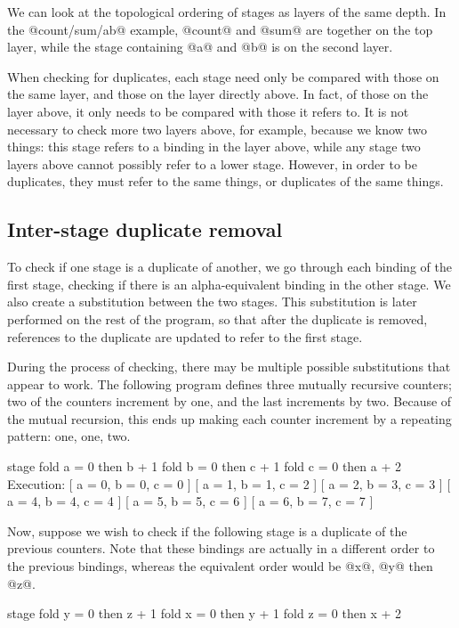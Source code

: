 We can look at the topological ordering of stages as layers of the same depth.
In the @count/sum/ab@ example, @count@ and @sum@ are together on the top layer, while the stage containing @a@ and @b@ is on the second layer.

When checking for duplicates, each stage need only be compared with those on the same layer, and those on the layer directly above.
In fact, of those on the layer above, it only needs to be compared with those it refers to.
It is not necessary to check more two layers above, for example, because we know two things:
this stage refers to a binding in the layer above, while any stage two layers above cannot possibly refer to a lower stage.
However, in order to be duplicates, they must refer to the same things, or duplicates of the same things.


\subsection{Inter-stage duplicate removal}
To check if one stage is a duplicate of another, we go through each binding of the first stage, checking if there is an alpha-equivalent binding in the other stage.
We also create a substitution between the two stages.
This substitution is later performed on the rest of the program, so that after the duplicate is removed, references to the duplicate are updated to refer to the first stage.

During the process of checking, there may be multiple possible substitutions that appear to work.
The following program defines three mutually recursive counters; two of the counters increment by one, and the last increments by two.
Because of the mutual recursion, this ends up making each counter increment by a repeating pattern: one, one, two.
\begin{code}
stage {
  fold a = 0 then b + 1
  fold b = 0 then c + 1
  fold c = 0 then a + 2
}
Execution:
[ a = 0, b = 0, c = 0 ]
[ a = 1, b = 1, c = 2 ]
[ a = 2, b = 3, c = 3 ]
[ a = 4, b = 4, c = 4 ]
[ a = 5, b = 5, c = 6 ]
[ a = 6, b = 7, c = 7 ]
\end{code}

Now, suppose we wish to check if the following stage is a duplicate of the previous counters.
Note that these bindings are actually in a different order to the previous bindings, whereas the equivalent order would be @x@, @y@ then @z@.
\begin{code}
stage {
  fold y = 0 then z + 1
  fold x = 0 then y + 1
  fold z = 0 then x + 2
}
\end{code}

